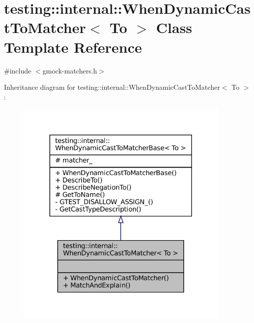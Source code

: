 \hypertarget{classtesting_1_1internal_1_1WhenDynamicCastToMatcher}{}\section{testing\+:\+:internal\+:\+:When\+Dynamic\+Cast\+To\+Matcher$<$ To $>$ Class Template Reference}
\label{classtesting_1_1internal_1_1WhenDynamicCastToMatcher}


{\ttfamily \#include $<$gmock-\/matchers.\+h$>$}



Inheritance diagram for testing\+:\+:internal\+:\+:When\+Dynamic\+Cast\+To\+Matcher$<$ To $>$\+:
\nopagebreak
\begin{figure}[H]
\begin{center}
\leavevmode
\includegraphics[width=296pt]{classtesting_1_1internal_1_1WhenDynamicCastToMatcher__inherit__graph}
\end{center}
\end{figure}


